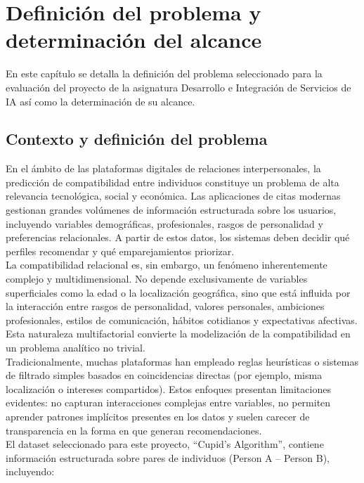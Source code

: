 \setcounter{secnumdepth}{2}

\chapter{Definición del problema y determinación del alcance}


En este capítulo se detalla la definición del problema seleccionado para la evaluación del proyecto de la asignatura Desarrollo e Integración de Servicios de IA así como la determinación de su alcance.

\section{Contexto y definición del problema}

En el ámbito de las plataformas digitales de relaciones interpersonales, la predicción de compatibilidad entre individuos constituye un problema de alta relevancia tecnológica, social y económica. Las aplicaciones de citas modernas gestionan grandes volúmenes de información estructurada sobre los usuarios, incluyendo variables demográficas, profesionales, rasgos de personalidad y preferencias relacionales. A partir de estos datos, los sistemas deben decidir qué perfiles recomendar y qué emparejamientos priorizar.\\

La compatibilidad relacional es, sin embargo, un fenómeno inherentemente complejo y multidimensional. No depende exclusivamente de variables superficiales como la edad o la localización geográfica, sino que está influida por la interacción entre rasgos de personalidad, valores personales, ambiciones profesionales, estilos de comunicación, hábitos cotidianos y expectativas afectivas. Esta naturaleza multifactorial convierte la modelización de la compatibilidad en un problema analítico no trivial.\\

Tradicionalmente, muchas plataformas han empleado reglas heurísticas o sistemas de filtrado simples basados en coincidencias directas (por ejemplo, misma localización o intereses compartidos). Estos enfoques presentan limitaciones evidentes: no capturan interacciones complejas entre variables, no permiten aprender patrones implícitos presentes en los datos y suelen carecer de transparencia en la forma en que generan recomendaciones.\\

El dataset seleccionado para este proyecto, “Cupid’s Algorithm”, contiene información estructurada sobre pares de individuos (Person A – Person B), incluyendo:

